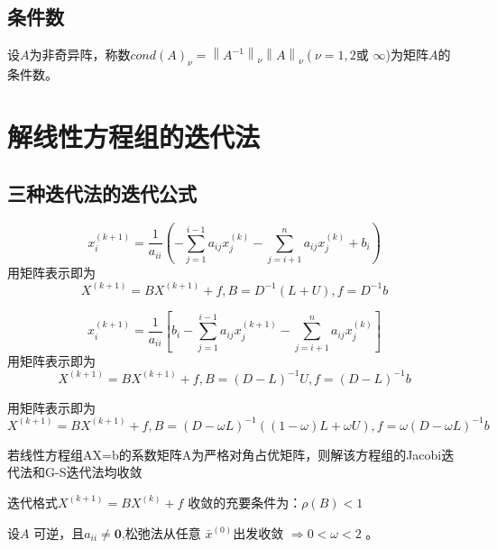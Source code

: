 \documentclass[lang=cn,14pt]{elegantbook}
\begin{document}
	\section{条件数}
	\begin{definition}
		设$A$为非奇异阵，称数$cond(A)_\nu=\left\|A^{-1}\right\|_\nu\left\|A\right\|_\nu\left(\nu=1,2\text{或}\right.$
		$\infty$)为矩阵$A$的条件数。
	\end{definition}
	\chapter{解线性方程组的迭代法}
	\section{三种迭代法的迭代公式}
	\begin{definition}[雅克比迭代法]
		\begin{equation*}
			x_i^{(k+1)}=\frac1{a_{ii}}(-\sum_{j=1}^{i-1}a_{ij}x_j^{(k)}-\sum_{j=i+1}^na_{ij}x_j^{(k)}+b_i)
		\end{equation*}
		用矩阵表示即为
		\begin{equation*}
			X^{(k+1)}=BX^{(k+1)}+f,B=D^{-1}(L+U),f=D^{-1}b
		\end{equation*}
	\end{definition}
	\begin{definition}[高斯-赛德尔迭代法]
		\begin{equation*}
			x_i^{(k+1)}=\frac1{a_{ii}}[b_i-\sum_{j=1}^{i-1}a_{ij}x_j^{(k+1)}-\sum_{j=i+1}^na_{ij}x_j^{(k)}]
		\end{equation*}
		用矩阵表示即为
		\begin{equation*}
			X^{(k+1)}=BX^{(k+1)}+f,B=(D-L)^{-1}U,f=(D-L)^{-1}b
		\end{equation*}
	\end{definition}
	\begin{definition}[SOR迭代法]
		用矩阵表示即为
		\begin{equation*}
			X^{(k+1)}=BX^{(k+1)}+f,B=(D-\omega L)^{-1}((1-\omega)L+\omega U),f=\omega(D-\omega L)^{-1}b
		\end{equation*}
	\end{definition}
	\begin{theorem}
		若线性方程组AX=b的系数矩阵A为严格对角占优矩阵，则解该方程组的Jacobi迭代法和G-S迭代法均收敛
	\end{theorem}
	\begin{theorem}
		迭代格式$X^{(k+1)}=BX^{(k)}+f$ 收敛的充要条件为：$\rho(B)<1$
	\end{theorem}
	\begin{theorem}
		设$A$ 可逆，且$a_{ii}\neq\mathbf{0}$,松弛法从任意 $\bar{x}^{(0)}$出发收敛 $\Rightarrow0<\omega<2$ 。
	\end{theorem}
\end{document}
